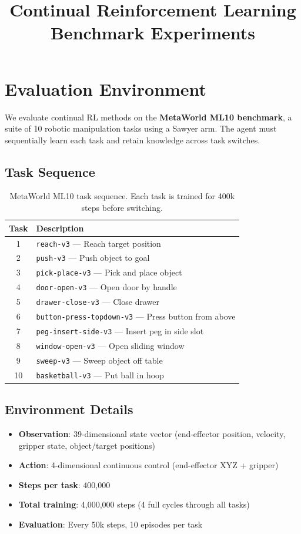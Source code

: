\documentclass{article}
\title{Continual Reinforcement Learning Benchmark Experiments}
\author{}
\date{}
\begin{document}
\maketitle

\section{Evaluation Environment}

We evaluate continual RL methods on the \textbf{MetaWorld ML10 benchmark}, a suite of 10 robotic manipulation tasks using a Sawyer arm. The agent must sequentially learn each task and retain knowledge across task switches.

\subsection{Task Sequence}

\begin{table}[h]
\centering
\caption{MetaWorld ML10 task sequence. Each task is trained for 400k steps before switching.}
\label{tab:tasks}
\begin{tabular}{cl}
\toprule
Task & Description \\
\midrule
1 & \texttt{reach-v3} --- Reach target position \\
2 & \texttt{push-v3} --- Push object to goal \\
3 & \texttt{pick-place-v3} --- Pick and place object \\
4 & \texttt{door-open-v3} --- Open door by handle \\
5 & \texttt{drawer-close-v3} --- Close drawer \\
6 & \texttt{button-press-topdown-v3} --- Press button from above \\
7 & \texttt{peg-insert-side-v3} --- Insert peg in side slot \\
8 & \texttt{window-open-v3} --- Open sliding window \\
9 & \texttt{sweep-v3} --- Sweep object off table \\
10 & \texttt{basketball-v3} --- Put ball in hoop \\
\bottomrule
\end{tabular}
\end{table}

\subsection{Environment Details}

\begin{itemize}
    \item \textbf{Observation}: 39-dimensional state vector (end-effector position, velocity, gripper state, object/target positions)
    \item \textbf{Action}: 4-dimensional continuous control (end-effector XYZ + gripper)
    \item \textbf{Steps per task}: 400,000
    \item \textbf{Total training}: 4,000,000 steps (4 full cycles through all tasks)
    \item \textbf{Evaluation}: Every 50k steps, 10 episodes per task
\end{itemize}
\end{document}
